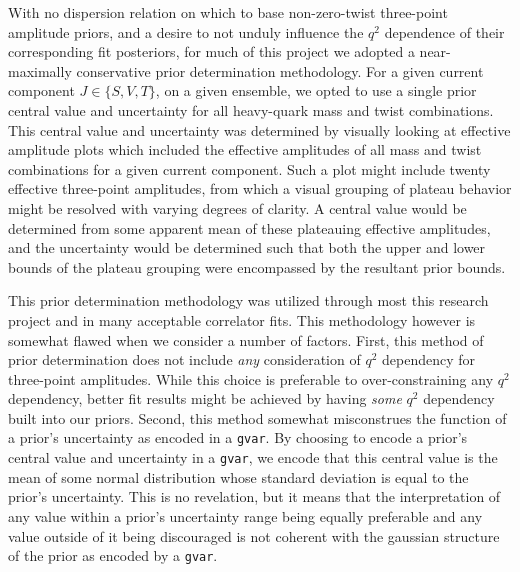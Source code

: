 With no dispersion relation on which to base non-zero-twist three-point amplitude priors, and a desire to not unduly influence the $q^2$ dependence of their corresponding fit posteriors, for much of this project we adopted a near-maximally conservative prior determination methodology.  For a given current component $J \in \{S,V,T\}$, on a given ensemble, we opted to use a single prior central value and uncertainty for all heavy-quark mass and twist combinations.  This central value and uncertainty was determined by visually looking at effective amplitude plots which included the effective amplitudes of all mass and twist combinations for a given current component. Such a plot might include twenty effective three-point amplitudes, from which a visual grouping of plateau behavior might be resolved with varying degrees of clarity.  A central value would be determined from some apparent mean of these plateauing effective amplitudes, and the uncertainty would be determined such that both the upper and lower bounds of the plateau grouping were encompassed by the resultant prior bounds.  

This prior determination methodology was utilized through most this research project and in many acceptable correlator fits.  This methodology however is somewhat flawed when we consider a number of factors.  First, this method of prior determination does not include \textit{any} consideration of $q^2$ dependency for three-point amplitudes.  While this choice is preferable to over-constraining any $q^2$ dependency, better fit results might be achieved by having \textit{some} $q^2$ dependency built into our priors.  Second, this method somewhat misconstrues the function of a prior's uncertainty as encoded in a \verb|gvar|.  By choosing to encode a prior's central value and uncertainty in a \verb|gvar|, we encode that this central value is the mean of some normal distribution whose standard deviation is equal to the prior's uncertainty.  This is no revelation, but it means that the interpretation of any value within a prior's uncertainty range being equally preferable and any value outside of it being discouraged is not coherent with the gaussian structure of the prior as encoded by a \verb|gvar|.  

